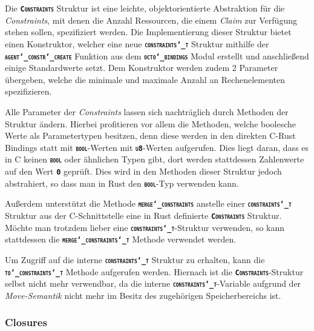 Die \texttt{\textsc{\textbf{Constraints}}} Struktur ist eine leichte,
objektorientierte Abstraktion für die \textit{Constraints}, mit denen die Anzahl Ressourcen,
die einem \textit{Claim} zur Verfügung stehen sollen, spezifiziert werden.
Die Implementierung dieser Struktur bietet einen Konstruktor, welcher eine neue
\texttt{\textsc{\textbf{constraints\char`_t}}} Struktur mithilfe der
\texttt{\textsc{\textbf{agent\char`_constr\char`_create}}}
Funktion aus dem \texttt{\textsc{\textbf{octo\char`_bindings}}} Modul erstellt und anschließend einige Standardwerte setzt. 
Dem Konstruktor werden zudem 2 Parameter übergeben,
welche die minimale und maximale Anzahl an Rechenelementen spezifizieren.

Alle Parameter der \textit{Constraints} lassen sich nachträglich durch Methoden der Struktur ändern.
Hierbei profitieren vor allem die Methoden, welche boolesche Werte als Parametertypen besitzen,
denn diese werden in den direkten C-Rust Bindings statt mit \texttt{\textsc{\textbf{bool}}}-Werten mit
\texttt{\textsc{\textbf{u8}}}-Werten aufgerufen. Dies liegt daran, dass es in C keinen
\texttt{\textsc{\textbf{bool}}} oder ähnlichen Typen gibt, dort werden stattdessen Zahlenwerte auf den
Wert \texttt{\textsc{\textbf{0}}} geprüft. Dies wird in den Methoden dieser Struktur jedoch abstrahiert,
so dass man in Rust den \texttt{\textsc{\textbf{bool}}}-Typ verwenden kann.

Außerdem unterstützt die Methode \texttt{\textsc{\textbf{merge\char`_constraints}}} anstelle einer
\texttt{\textsc{\textbf{constraints\char`_t}}} Struktur aus der C-Schnittstelle eine in Rust definierte
\texttt{\textsc{\textbf{Constraints}}} Struktur. Möchte man trotzdem lieber eine
\texttt{\textsc{\textbf{constraints\char`_t}}}-Struktur verwenden, so kann stattdessen die
\texttt{\textsc{\textbf{merge\char`_constraints\char`_t}}} Methode verwendet werden.

Um Zugriff auf die interne \texttt{\textsc{\textbf{constraints\char`_t}}} Struktur zu erhalten, kann die
\texttt{\textsc{\textbf{to\char`_constraints\char`_t}}} Methode aufgerufen werden.
Hiernach ist die \texttt{\textsc{\textbf{Constraints}}}-Struktur selbst nicht mehr verwendbar,
da die interne \texttt{\textsc{\textbf{constraints\char`_t}}}-Variable aufgrund der \textit{Move-Semantik}
nicht mehr im Besitz des zugehörigen Speicherbereichs ist.

\subsubsection{Closures}

